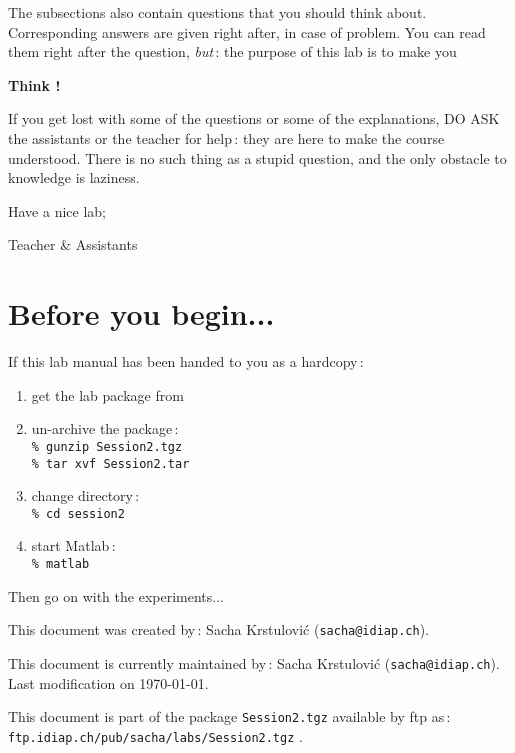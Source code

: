 \documentclass[twoside,a4paper,titlepage]{article}
\begin{document}
The subsections also contain questions that you should think about.
Corresponding answers are given right after, in case of problem. You can
read them right after the question, {\em but}\,: the purpose of this lab is
to make you

\medskip
\centerline{\LARGE \bf Think !}
\medskip

If you get lost with some of the questions or some of the explanations, DO
ASK the assistants or the teacher for help\,: they are here to make the course
understood. There is no such thing as a stupid question, and the only
obstacle to knowledge is laziness.

\bigskip
Have a nice lab;

\hfill Teacher \& Assistants \hspace{2cm}


\vfill
\section*{Before you begin...}
If this lab manual has been handed to you as a hardcopy\,:
\begin{enumerate}
\item get the lab package from \\
	\hspace{2cm}{\tt ftp.idiap.ch/pub/sacha/labs/Session2.tgz}
\item un-archive the package\,: \\
	{\tt \% gunzip Session2.tgz \\
	\% tar xvf Session2.tar}
\item change directory\,: \\
	{\tt \% cd session2}
\item start {\sc Matlab}\,: \\
	{\tt \% matlab }
\end{enumerate}
Then go on with the experiments...


\vspace{1cm}

{\scriptsize
\noindent
This document was created by\,: Sacha Krstulovi\'c ({\tt sacha@idiap.ch}).

\noindent
This document is currently maintained by\,: Sacha Krstulovi\'c ({\tt sacha@idiap.ch}). Last modification on \today.

\noindent
This document is part of the package {\tt Session2.tgz} available by ftp as\,: {\tt ftp.idiap.ch/pub/sacha/labs/Session2.tgz} .
}
\end{document}
